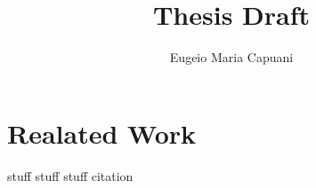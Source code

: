 \documentclass[a4paper,11pt]{article}
\begin{document}
\pagestyle{fancy}
\title{Thesis Draft}
\author{Eugeio Maria Capuani}
\maketitle
\cleardoublepage
\section{Realated Work}
stuff stuff stuff citation \cite{texbook}
\cleardoublepage
\thispagestyle{empty}
\printbibliography    
\end{document}
